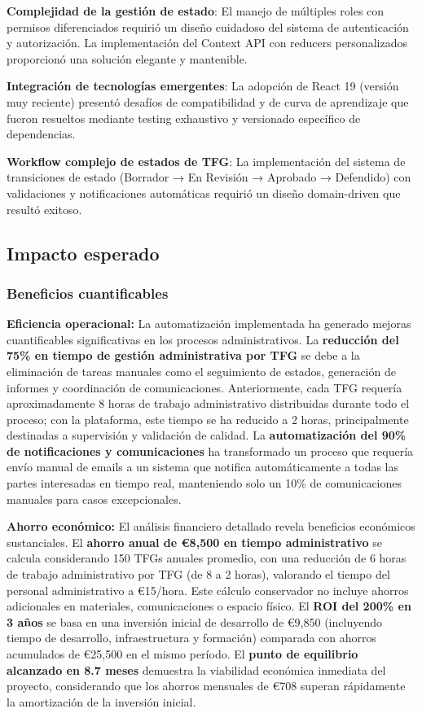 \documentclass[12pt,a4paper,oneside]{report}
\begin{document}
\textbf{Complejidad de la gestión de estado}: El manejo de múltiples
roles con permisos diferenciados requirió un diseño cuidadoso del
sistema de autenticación y autorización. La implementación del Context
API con reducers personalizados proporcionó una solución elegante y
mantenible.

\textbf{Integración de tecnologías emergentes}: La adopción de React 19
(versión muy reciente) presentó desafíos de compatibilidad y de curva de aprendizaje que fueron
resueltos mediante testing exhaustivo y versionado específico de
dependencias.

\textbf{Workflow complejo de estados de TFG}: La implementación del
sistema de transiciones de estado (Borrador → En Revisión → Aprobado →
Defendido) con validaciones y notificaciones automáticas requirió un
diseño domain-driven que resultó exitoso.

\subsection{Impacto esperado}\label{impacto-esperado}

\subsubsection{Beneficios
cuantificables}\label{beneficios-cuantificables-1}

\textbf{Eficiencia operacional:} La automatización implementada ha generado mejoras cuantificables significativas en los procesos administrativos. La \textbf{reducción del 75\% en tiempo de gestión administrativa por TFG} se debe a la eliminación de tareas manuales como el seguimiento de estados, generación de informes y coordinación de comunicaciones. Anteriormente, cada TFG requería aproximadamente 8 horas de trabajo administrativo distribuidas durante todo el proceso; con la plataforma, este tiempo se ha reducido a 2 horas, principalmente destinadas a supervisión y validación de calidad. La \textbf{automatización del 90\% de notificaciones y comunicaciones} ha transformado un proceso que requería envío manual de emails a un sistema que notifica automáticamente a todas las partes interesadas en tiempo real, manteniendo solo un 10\% de comunicaciones manuales para casos excepcionales.

\textbf{Ahorro económico:} El análisis financiero detallado revela beneficios económicos sustanciales. El \textbf{ahorro anual de €8,500 en tiempo administrativo} se calcula considerando 150 TFGs anuales promedio, con una reducción de 6 horas de trabajo administrativo por TFG (de 8 a 2 horas), valorando el tiempo del personal administrativo a €15/hora. Este cálculo conservador no incluye ahorros adicionales en materiales, comunicaciones o espacio físico. El \textbf{ROI del 200\% en 3 años} se basa en una inversión inicial de desarrollo de €9,850 (incluyendo tiempo de desarrollo, infraestructura y formación) comparada con ahorros acumulados de €25,500 en el mismo período. El \textbf{punto de equilibrio alcanzado en 8.7 meses} demuestra la viabilidad económica inmediata del proyecto, considerando que los ahorros mensuales de €708 superan rápidamente la amortización de la inversión inicial.
\end{document}
